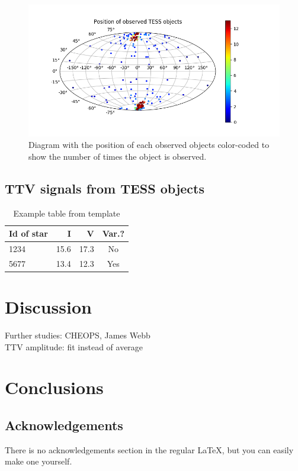 \documentclass[12pt]{report}
\begin{document}
	\begin{figure}
		\centering
		\includegraphics[width=12cm]{img/skymap_TESS_wrap.png}
	  	\caption{Diagram with the position of each observed objects color-coded to show the number of times the object is observed.}	
	  	\label{fig:skymap_TESS}	
	  \end{figure}

\section{TTV signals from TESS objects}


\begin{table}[!h]
\caption{Example table from template}\smallskip
\label{table:1}
\centering  
\begin{tabular}{lrrc}
\hline\hline  
\smallskip
Id of star & I &  V & Var.? \\
\hline
1234 & 15.6 & 17.3 & No \\
5677 & 13.4 & 12.3 & Yes\\
\hline
\end{tabular}
\end{table}

\chapter{Discussion}
	Further studies: CHEOPS, James Webb\\
	TTV amplitude: fit instead of average
\chapter{Conclusions}


\section*{Acknowledgements}

There is no acknowledgements section in the regular LaTeX, but you can easily
make one yourself.
\end{document}
